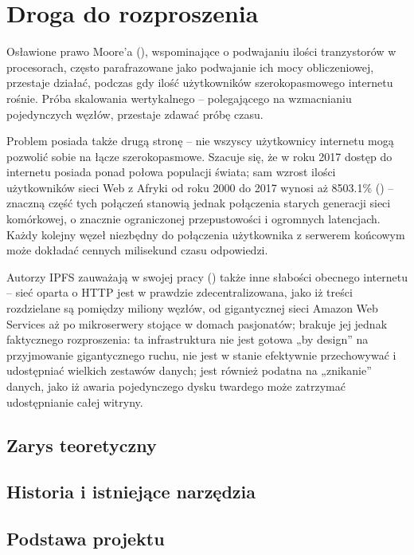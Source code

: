 \chapter{Droga do rozproszenia}
\label{cha:rozproszenie}

Osławione prawo Moore'a (\cite{moore1998cramming}), wspominające o podwajaniu ilości tranzystorów w procesorach, często parafrazowane jako podwajanie ich mocy obliczeniowej, przestaje działać, podczas gdy ilość użytkowników szerokopasmowego internetu rośnie. 
Próba skalowania wertykalnego -- polegającego na wzmacnianiu pojedynczych węzłów, przestaje zdawać próbę czasu.

Problem posiada także drugą stronę -- nie wszyscy użytkownicy internetu mogą pozwolić sobie na łącze szerokopasmowe. Szacuje się, że w roku 2017 dostęp do internetu posiada ponad połowa populacji świata; sam wzrost ilości użytkowników sieci Web z Afryki od roku 2000 do 2017 wynosi aż 8503.1\% (\cite{webStats}) – znaczną część tych połączeń stanowią jednak połączenia starych generacji sieci komórkowej, o znacznie ograniczonej przepustowości i ogromnych latencjach. Każdy kolejny węzeł niezbędny do połączenia użytkownika z serwerem końcowym może dokładać cennych milisekund czasu odpowiedzi. 

Autorzy IPFS zauważają w swojej pracy (\cite{ipfsWP}) także inne słabości obecnego internetu – sieć oparta o HTTP jest w prawdzie zdecentralizowana, jako iż treści rozdzielane są pomiędzy miliony węzłów, od gigantycznej sieci Amazon Web Services aż po mikroserwery stojące w domach pasjonatów; brakuje jej jednak faktycznego rozproszenia: ta infrastruktura nie jest gotowa „by design” na przyjmowanie gigantycznego ruchu, nie jest w stanie efektywnie przechowywać i udostępniać wielkich zestawów danych; jest również podatna na „znikanie” danych, jako iż awaria pojedynczego dysku twardego może zatrzymać udostępnianie całej witryny. 


\section{Zarys teoretyczny}
\label{sec:teoriaRozproszenia}


\section{Historia i istniejące narzędzia}
\label{sec:narzedzia}

\section{Podstawa projektu}
\label{sec:podstawaProjektu}
